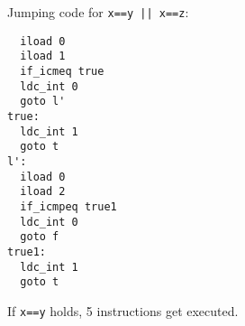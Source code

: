 \begin{slide*}
Jumping code for \verb$x==y || x==z$:

\begin{scriptsize}
\begin{verbatim}
  iload 0
  iload 1
  if_icmeq true
  ldc_int 0
  goto l'
true:
  ldc_int 1
  goto t
l':
  iload 0
  iload 2
  if_icmpeq true1
  ldc_int 0
  goto f
true1:
  ldc_int 1
  goto t
\end{verbatim}
\end{scriptsize}
If \verb$x==y$ holds, 5 instructions get executed.

\vfil
\end{slide*}
 


